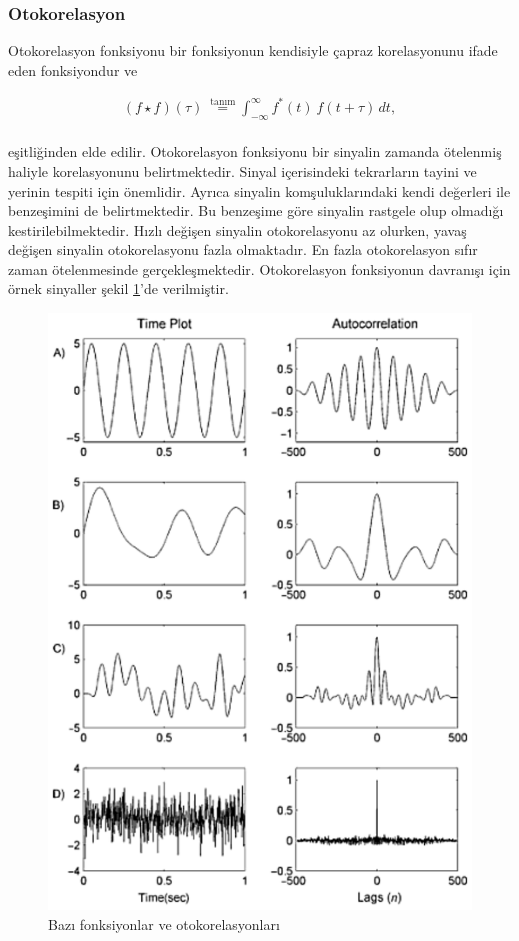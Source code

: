 \documentclass[turkish]{report}
\begin{document}
\subsubsection*{Otokorelasyon}

Otokorelasyon fonksiyonu bir fonksiyonun kendisiyle çapraz korelasyonunu ifade eden fonksiyondur ve 

\begin{align}
(f \star f)(\tau)\ \stackrel{\mathrm{tanım}}{=} \int_{-\infty}^{\infty} f^*(t)\ f(t+\tau)\,dt,
\label{esitlik:otokorelasyon}
\end{align}
\\
eşitliğinden elde edilir. Otokorelasyon fonksiyonu bir sinyalin zamanda ötelenmiş haliyle korelasyonunu belirtmektedir. Sinyal içerisindeki tekrarların tayini ve yerinin tespiti için önemlidir. Ayrıca sinyalin komşuluklarındaki kendi değerleri ile benzeşimini de belirtmektedir. Bu benzeşime göre sinyalin rastgele olup olmadığı kestirilebilmektedir. Hızlı değişen sinyalin otokorelasyonu az olurken, yavaş değişen sinyalin otokorelasyonu fazla olmaktadır. En fazla otokorelasyon sıfır zaman ötelenmesinde gerçekleşmektedir. Otokorelasyon fonksiyonun davranışı için örnek sinyaller şekil \ref{fig:autocorrelation}'de verilmiştir.

\begin{figure}
\centering
\includegraphics{./Figures/autocorrelation.eps}
\caption{Bazı fonksiyonlar ve otokorelasyonları \cite{semmlow2012signals}}
\label{fig:autocorrelation}
\end{figure}
\end{document}

